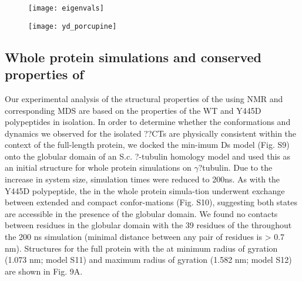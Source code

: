 \begin{figure}
\centering
	\texttt{[image: eigenvals]}
	\label{fig:eigenvalues}
\end{figure}

\begin{figure}
	\thispagestyle{empty}
	\centering     %
	\clearpage
	\label{fig:pca}
\end{figure}




\begin{figure}
\texttt{[image: yd\_porcupine]}
\label{fig:porcupine}
\end{figure}  


\subsection{Whole protein simulations and conserved properties of \gct}

Our experimental analysis of the structural properties of the \gct using NMR and corresponding MDS are based on the properties of the WT and Y445D \gct polypeptides in isolation. In order to determine whether the conformations and dynamics we observed for the isolated ??CTs are physically consistent within the context of the full-length \tub protein, we docked the min-imum Ds \gct model (Fig. S9) onto the globular domain of an S.c. ?-tubulin homology model and used this as an initial structure for whole protein simulations on $\gamma$?tubulin. Due to the increase in system size, simulation times were reduced to 200ns.  As with the Y445D \gct polypeptide, the \gct in the whole protein simula-tion underwent exchange between extended and compact confor-mations (Fig. S10), suggesting both states are accessible in the presence of the globular domain. We found no contacts between residues in the globular domain with the 39 residues of the \gct throughout the 200 ns simulation (minimal distance between any pair of residues is > 0.7 nm). Structures for the full protein with the \gct at minimum radius of gyration (1.073 nm; model S11) and maximum radius of gyration (1.582 nm; model S12) are shown in Fig. 9A.


